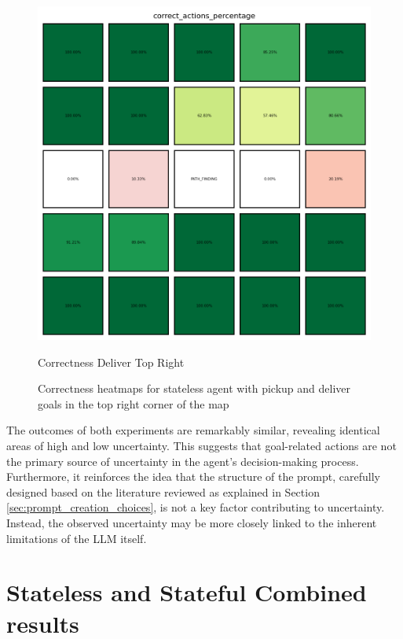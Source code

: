 \begin{figure}[h!]
\begin{minipage}[b]{0.45\textwidth}
    \includegraphics[width=\textwidth]{
      images/results_discussion/path_finding/correct_actions_percentage_PERC.png
    }
    \caption{Correctness Deliver Top Right}
    \label{fig:path_finding_corr}
  \end{minipage}
  \caption{Correctness heatmaps for stateless agent with pickup and deliver
  goals in the top right corner of the map}
  \label{fig:path_finding}
\end{figure}

The outcomes of both experiments are remarkably similar, revealing identical areas
of high and low uncertainty. This suggests that goal-related actions are not the
primary source of uncertainty in the agent's decision-making process. Furthermore,
it reinforces the idea that the structure of the prompt, carefully designed based
on the literature reviewed as explained in Section \ref{sec:prompt_creation_choices},
is not a key factor contributing to uncertainty. Instead, the observed
uncertainty may be more closely linked to the inherent limitations of the LLM
itself.

\section{Stateless and Stateful Combined results}
\label{sec:stateless_and_stateful_combined_results}

